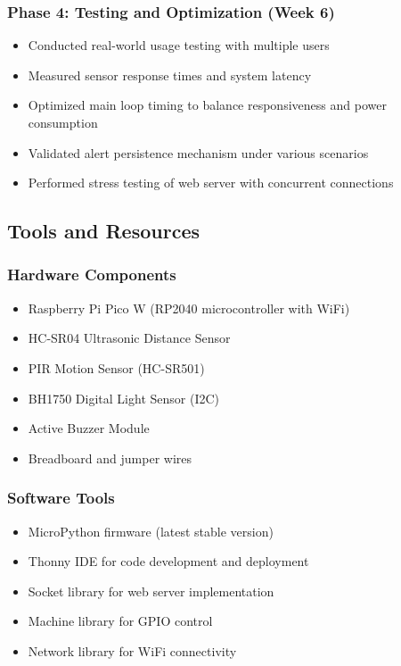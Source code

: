 \documentclass[12pt,a4paper]{article}
\begin{document}
\subsubsection{Phase 4: Testing and Optimization (Week 6)}

\begin{itemize}
\item Conducted real-world usage testing with multiple users
\item Measured sensor response times and system latency
\item Optimized main loop timing to balance responsiveness and power consumption
\item Validated alert persistence mechanism under various scenarios
\item Performed stress testing of web server with concurrent connections
\end{itemize}

\subsection{Tools and Resources}

\subsubsection{Hardware Components}

\begin{itemize}
\item Raspberry Pi Pico W (RP2040 microcontroller with WiFi)
\item HC-SR04 Ultrasonic Distance Sensor
\item PIR Motion Sensor (HC-SR501)
\item BH1750 Digital Light Sensor (I2C)
\item Active Buzzer Module
\item Breadboard and jumper wires
\end{itemize}

\subsubsection{Software Tools}

\begin{itemize}
\item MicroPython firmware (latest stable version)
\item Thonny IDE for code development and deployment
\item Socket library for web server implementation
\item Machine library for GPIO control
\item Network library for WiFi connectivity
\end{itemize}
\end{document}
